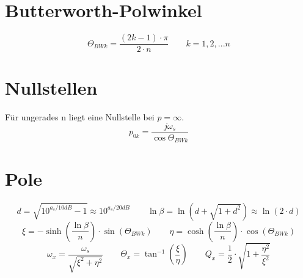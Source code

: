 \documentclass[a4paper, 12pt]{report}
\begin{document}
\section*{Butterworth-Polwinkel}
	\[ \varTheta_{BWk} = \frac{(2k-1)\cdot \pi}{2 \cdot n} \qquad k = 1, 2, ... n \]

\section*{Nullstellen}
	Für ungerades n liegt eine Nullstelle bei $ p = \infty $.
	\[ p_{0k} = \frac{j \omega_s}{\cos{\varTheta_{BWk}}} \]
	
\section*{Pole}
	\[ d = \sqrt{10^{a_s/10dB} - 1} \approx 10^{a_s / 20dB} \qquad \ln \beta = \ln \left( d + \sqrt{1 + d^2}\right) \approx \ln \left( 2 \cdot d\right) \]
	\vspace{0cm}
	\[ \xi = - \sinh \left(\frac{\ln \beta}{n}\right) \cdot \sin \left(\varTheta_{BWk} \right) \qquad \eta = \cosh \left(\frac{\ln \beta}{n}\right) \cdot \cos \left(\varTheta_{BWk}\right)\]
	\vspace{0cm}
	\[ \omega_x = \frac{\omega_s}{\sqrt{\xi^2 + \eta^2}} \qquad \varTheta_x = \tan^{-1}\left(\frac{\xi}{\eta}\right) \qquad Q_x = \frac{1}{2} \cdot \sqrt{1 + \frac{\eta^2}{\xi^2}} \]
	
\clearpage
   	
\end{document}
